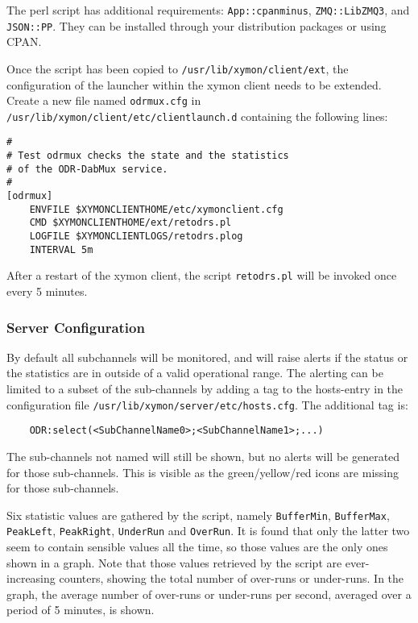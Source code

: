 The perl script has additional requirements:
\texttt{App::cpanminus}, \texttt{ZMQ::LibZMQ3}, and \texttt{JSON::PP}. They can
be installed through your distribution packages or using CPAN.

Once the script has been copied to \verb+/usr/lib/xymon/client/ext+, the
configuration of the launcher within the xymon client needs to be extended.
Create a new file named \verb+odrmux.cfg+ in
\verb+/usr/lib/xymon/client/etc/clientlaunch.d+ containing the following lines:

\begin{verbatim}
#
# Test odrmux checks the state and the statistics
# of the ODR-DabMux service.
#
[odrmux]
	ENVFILE $XYMONCLIENTHOME/etc/xymonclient.cfg
	CMD $XYMONCLIENTHOME/ext/retodrs.pl
	LOGFILE $XYMONCLIENTLOGS/retodrs.plog
	INTERVAL 5m
\end{verbatim}

After a restart of the xymon client, the script \verb+retodrs.pl+ will
be invoked once every 5 minutes.


\subsubsection{Server Configuration}

By default all subchannels will be monitored, and will raise alerts if the
status or the statistics are in outside of a valid operational range. The
alerting can be limited to a subset of the sub-channels by adding a tag to the
hosts-entry in the configuration file \verb+/usr/lib/xymon/server/etc/hosts.cfg+.
The additional tag is:

\begin{verbatim}
	ODR:select(<SubChannelName0>;<SubChannelName1>;...)
\end{verbatim}

The sub-channels not named will still be shown, but no alerts will be generated
for those sub-channels. This is visible as the green/yellow/red icons are
missing for those sub-channels.

Six statistic values are gathered by the script, namely
\texttt{BufferMin}, \texttt{BufferMax}, \texttt{PeakLeft}, \texttt{PeakRight},
\texttt{UnderRun} and \texttt{OverRun}. It is found that only the latter two
seem to contain sensible values all the time, so those values are the only
ones shown in a graph. Note that those values retrieved by the script are
ever-increasing counters, showing the total number of over-runs or under-runs.
In the graph, the average number of over-runs or under-runs per second, averaged
over a period of 5 minutes, is shown.

